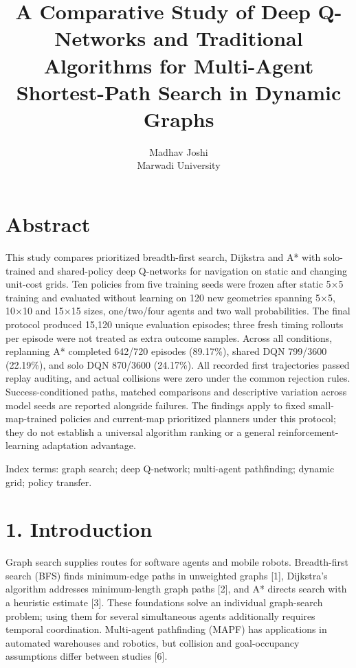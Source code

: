 \documentclass[10pt,a4paper]{article}
\title{A Comparative Study of Deep Q-Networks and Traditional Algorithms for Multi-Agent Shortest-Path Search in Dynamic Graphs}
\author{Madhav Joshi \\ Marwadi University}
\date{}
\begin{document}
\maketitle



\section*{Abstract}

This study compares prioritized breadth-first search, Dijkstra and A* with solo-trained and shared-policy deep Q-networks for navigation on static and changing unit-cost grids. Ten policies from five training seeds were frozen after static 5×5 training and evaluated without learning on 120 new geometries spanning 5×5, 10×10 and 15×15 sizes, one/two/four agents and two wall probabilities. The final protocol produced 15,120 unique evaluation episodes; three fresh timing rollouts per episode were not treated as extra outcome samples. Across all conditions, replanning A* completed 642/720 episodes (89.17\%), shared DQN 799/3600 (22.19\%), and solo DQN 870/3600 (24.17\%). All recorded first trajectories passed replay auditing, and actual collisions were zero under the common rejection rules. Success-conditioned paths, matched comparisons and descriptive variation across model seeds are reported alongside failures. The findings apply to fixed small-map-trained policies and current-map prioritized planners under this protocol; they do not establish a universal algorithm ranking or a general reinforcement-learning adaptation advantage.

Index terms: graph search; deep Q-network; multi-agent pathfinding; dynamic grid; policy transfer.

\section*{1. Introduction}

Graph search supplies routes for software agents and mobile robots. Breadth-first
search (BFS) finds minimum-edge paths in unweighted graphs [1], Dijkstra's algorithm
addresses minimum-length graph paths [2], and A* directs search with a heuristic
estimate [3]. These foundations solve an individual graph-search problem; using
them for several simultaneous agents additionally requires temporal coordination.
Multi-agent pathfinding (MAPF) has applications in automated warehouses and
robotics, but collision and goal-occupancy assumptions differ between studies [6].
\end{document}
